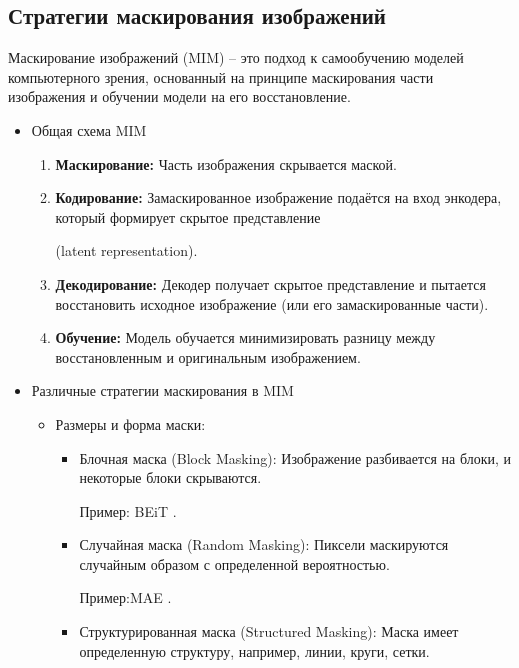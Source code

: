 \subsection{Стратегии маскирования изображений}
Маскирование изображений (MIM) – это подход к самообучению моделей компьютерного зрения, основанный на принципе маскирования части изображения и обучении модели на его восстановление. 
\begin{itemize}
    \item{Общая схема MIM}

    \begin{enumerate}
        \item \textbf{Маскирование:} Часть изображения скрывается маской.
        \item \textbf{Кодирование:} Замаскированное изображение подаётся на вход энкодера, который формирует скрытое представление
        
         (latent representation).
        \item \textbf{Декодирование:} Декодер получает скрытое представление и пытается восстановить исходное изображение (или его замаскированные части).
        \item \textbf{Обучение:} Модель обучается минимизировать разницу между восстановленным и оригинальным изображением.
    \end{enumerate}

    \item{Различные стратегии маскирования в MIM}

    \begin{itemize}
        \item Размеры и форма маски:
            \begin{itemize}
                \item Блочная маска (Block Masking): Изображение разбивается на блоки, и некоторые блоки скрываются.
                
                Пример: BEiT \cite{bao2021beit}.
                \item Случайная маска (Random Masking): Пиксели маскируются случайным образом с определенной вероятностью.
                 
                Пример:MAE \cite{he2021masked}.
                \item Структурированная маска (Structured Masking): Маска имеет определенную структуру, например, линии, круги, сетки. 


\end{itemize}
\end{itemize}
\end{itemize}
